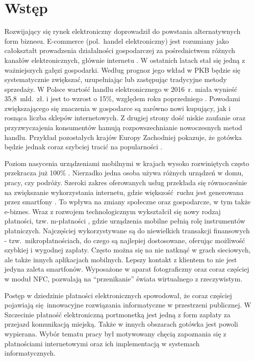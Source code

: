 \section*{Wstęp}

Rozwijający się rynek elektroniczny doprowadził do powstania alternatywnych form biznesu. E-commerce (pol.~handel elektroniczny) \cite{biblia_ebiznesu} jest rozumiany jako całokształt prowadzenia działalności gospodarczej za pośrednictwem różnych kanałów elektronicznych, głównie internetu \cite{pieniadz_elektroniczny-analiza}. W ostatnich latach stał się jedną z ważniejszych gałęzi gospodarki. Według prognoz jego wkład w PKB będzie się systematycznie zwiększać, uzupełniając lub zastępując tradycyjne metody sprzedaży. W Polsce wartość handlu elektronicznego w 2016~r. miała wynieść 35,8~mld.~zł. i jest to wzrost o 15\%, względem roku poprzedniego \cite{barometr_radio}. Powodami zwiększającego się znaczenia w gospodarce są zarówno nowi kupujący, jak i rosnąca liczba sklepów internetowych. Z drugiej strony dość niskie zaufanie oraz przyzwyczajenia konsumentów hamują rozpowszechnianie nowoczesnych metod handlu. Przykład pozostałych krajów Europy Zachodniej pokazuje, że gotówka będzie jednak coraz szybciej tracić na popularności \cite{pieniadz_elektroniczny-analiza}.

Poziom nasycenia urządzeniami mobilnymi w krajach wysoko rozwiniętych często przekracza już 100\% \cite{biblia_ebiznesu}. Nierzadko jedna osoba używa różnych urządzeń w domu, pracy, czy podróży. Szeroki zakres oferowanych usług przekłada się równocześnie na zwiększanie wykorzystania internetu, gdzie większość ruchu jest generowana przez smartfony \cite{ruch_mobilny-internet}. To wpływa na zmiany społeczne oraz gospodarcze, w tym także e-biznes. Wraz z rozwojem technologicznym wykształcił się nowy rodzaj płatności, tzw. m-płatności \cite{biblia_ebiznesu}, gdzie urządzenia mobilne pełnią rolę instrumentów płatniczych. Najczęściej wykorzystywane są do niewielkich transakcji finansowych - tzw.~mikropłatnościach, do czego są najlepiej dostosowane, oferując możliwość szybkiej i wygodnej zapłaty. Często można się na nie natknąć w grach sieciowych, ale także innych aplikacjach mobilnych. Lepszy kontakt z klientem to nie jest jedyna zaleta smartfonów. Wyposażone w aparat fotograficzny oraz coraz częściej w moduł NFC, pozwalają na ``przenikanie'' świata wirtualnego z rzeczywistym.

Postęp w dziedzinie płatności elektronicznych spowodował, że coraz częściej pojawiają się innowacyjne rozwiązania informatyczne w przestrzeni publicznej. W Szczecinie płatność elektroniczną portmonetką jest jedną z form zapłaty za przejazd komunikacją miejską. Także w innych obszarach gotówka jest powoli wypierana. Wybór tematu pracy był motywowany chęcią zapoznania się z płatnościami internetowymi oraz ich implementacją w systemach informatycznych.

